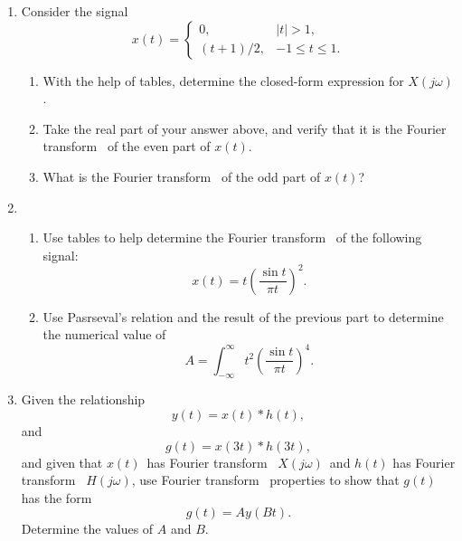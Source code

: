 \documentclass[11pt]{article}
\newcommand\ft{Fourier transform}
\newcommand\xt{$x(t)$}
\newcommand\xo{$X(j\omega)$}
\begin{document}
\begin{enumerate}
\begin{equation*}
\begin{cases}
            \end{cases}
        \end{equation*}
        \begin{enumerate}
            \item Use differentiation and integration properties and the \ft~ pair for the rectangular pulse to find a closed-form expression for \xo.
            \item What is the \ft~ of $g(t) = x(t) - \frac{1}{2}$?
        \end{enumerate}
    \item Consider the signal
        \begin{equation*}
            x(t) = \begin{cases} 0, & |t| > 1,\\ (t + 1)/2, & -1 \leq t \leq 1.\end{cases}
        \end{equation*}
        \begin{enumerate}
            \item With the help of tables, determine the closed-form expression for \xo.
            \item Take the real part of your answer above, and verify that it is the \ft~ of the even part of \xt.
            \item What is the \ft~ of the odd part of \xt?
        \end{enumerate}

    \item
        \begin{enumerate}
            \item Use tables to help determine the \ft~ of the following signal:
            \begin{equation*}
                x(t) = t\left(\frac{\sin t}{\pi t}\right)^2.
            \end{equation*}
            \item Use Pasrseval's relation and the result of the previous part to determine the numerical value of
            \begin{equation*}
                A = \int_{-\infty}^{\infty} t^2\left(\frac{\sin t}{\pi t}\right)^4.
            \end{equation*}
        \end{enumerate}

    \item Given the relationship
    \begin{equation*}
        y(t) = x(t)\ast h(t),
    \end{equation*}
    and
    \begin{equation*}
        g(t) = x(3t)\ast h(3t),
    \end{equation*}
    and given that \xt~has \ft~ \xo~and $h(t)$ has \ft~ $H(j\omega)$, use \ft~ properties to show that $g(t)$ has the form
    \begin{equation*}
        g(t) = Ay(Bt).
    \end{equation*}
    Determine the values of $A$ and $B$.


\end{enumerate}
\end{document}
